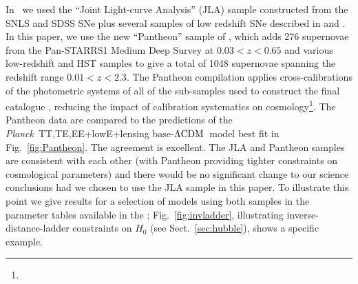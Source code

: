 \documentclass[longauth,traditabstract]{aa}
\def\Planck{\textit{Planck}}
\newcommand{\mksym}[1]{\ifmmode {\rm #1}\else #1\fi}
\newcommand{\dataplus}{\allowbreak+}
\newcommand{\TTTEEE}{\mksym{TT,TE,EE}}
\newcommand{\planckTTTEEEonly}{\planck\ \TTTEEE}
\newcommand{\lowE}{\mksym{lowE}}
\newcommand{\planckall}{\planckTTTEEEonly\dataplus\lowE}
\providecommand{\LCDM}{{$\rm{\Lambda CDM}$}}
\newcommand{\paramsII}{\citetalias{planck2014-a15}}
\newcommand{\PLA}{\citetalias{PLA}}
\newcommand{\planck}{\Planck}
\begin{document}
 In \paramsII\ we used the ``Joint Light-curve Analysis'' (JLA) sample
 constructed from the SNLS and SDSS SNe plus several samples of
 low redshift SNe described in
 \citet{Betoule:2013,Betoule:2014} and \citet{Mosher:2014}.
 In this paper, we use the
 new ``Pantheon'' sample of \citet{Scolnic:2017caz}, which adds 276
 supernovae from the Pan-STARRS1 Medium Deep Survey at $0.03< z< 0.65$
 and various low-redshift and HST samples to give a total
of 1048 supernovae spanning the redshift range $0.01<z<2.3$. The Pantheon compilation
applies cross-calibrations of the photometric systems of all of the sub-samples
 used to construct the final catalogue \citep{Scolnic:2015},
reducing the impact of calibration systematics on cosmology\footnote{}. The Pantheon data are
compared to the predictions of the \planckall+lensing base-\LCDM\ model best fit in Fig.~\ref{fig:Pantheon}. The agreement is excellent.  The JLA and Pantheon samples are consistent with each other (with Pantheon providing tighter constraints on cosmological parameters) and there
would be no significant change to our science conclusions had we chosen to use the JLA sample in this paper. To illustrate this point we give results for a selection of models using both samples
in the parameter tables available in the \PLA; Fig.~\ref{fig:invladder}, illustrating inverse-distance-ladder constraints on $H_0$ (see Sect.~\ref{sec:hubble}),
shows a specific example.
\end{document}
